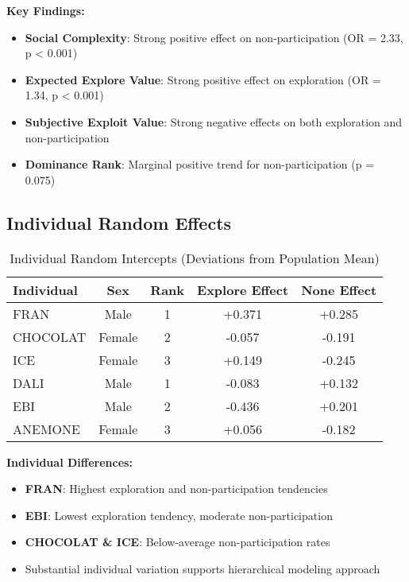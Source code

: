\documentclass[11pt]{article}
\begin{document}
\textbf{Key Findings:}
\begin{itemize}
    \item \textbf{Social Complexity}: Strong positive effect on non-participation (OR = 2.33, p < 0.001)
    \item \textbf{Expected Explore Value}: Strong positive effect on exploration (OR = 1.34, p < 0.001)
    \item \textbf{Subjective Exploit Value}: Strong negative effects on both exploration and non-participation
    \item \textbf{Dominance Rank}: Marginal positive trend for non-participation (p = 0.075)
\end{itemize}

\subsection{Individual Random Effects}

\begin{table}[H]
\centering
\caption{Individual Random Intercepts (Deviations from Population Mean)}
\begin{tabular}{lcccc}
\toprule
\textbf{Individual} & \textbf{Sex} & \textbf{Rank} & \textbf{Explore Effect} & \textbf{None Effect} \\
\midrule
FRAN & Male & 1 & +0.371 & +0.285 \\
CHOCOLAT & Female & 2 & -0.057 & -0.191 \\
ICE & Female & 3 & +0.149 & -0.245 \\
DALI & Male & 1 & -0.083 & +0.132 \\
EBI & Male & 2 & -0.436 & +0.201 \\
ANEMONE & Female & 3 & +0.056 & -0.182 \\
\bottomrule
\end{tabular}
\label{tab:random_effects}
\end{table}

\textbf{Individual Differences:}
\begin{itemize}
    \item \textbf{FRAN}: Highest exploration and non-participation tendencies
    \item \textbf{EBI}: Lowest exploration tendency, moderate non-participation
    \item \textbf{CHOCOLAT \& ICE}: Below-average non-participation rates
    \item Substantial individual variation supports hierarchical modeling approach
\end{itemize}
\end{document}
